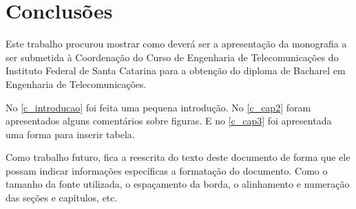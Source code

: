 
\chapter{Conclusões}
\label{c_conclusoes}

Este trabalho procurou mostrar como deverá ser a apresentação da monografia a ser submetida à Coordenação do Curso de Engenharia de Telecomunicações do Instituto Federal de Santa Catarina para a obtenção do diploma de Bacharel em Engenharia de Telecomunicações.

No \autoref{c_introducao} foi feita uma pequena introdução. No \autoref{c_cap2} foram apresentados alguns comentários sobre figuras. E no \autoref{c_cap3} foi apresentada uma forma para inserir tabela.

Como trabalho futuro, fica a reescrita do texto deste documento de forma que ele possam indicar informações específicas a formatação do documento. Como o tamanho da fonte utilizada, o espaçamento da borda, o alinhamento e numeração das seções e capítulos, etc.